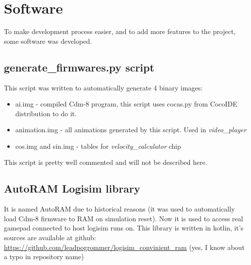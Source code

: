 \documentclass[12pt,a4paper]{article}
\let\oldsection\section
\renewcommand\section{\clearpage\oldsection}
\newcommand{\chip}[1]{{\itshape#1}}
\begin{document}
    \section{Software}
    To make development process easier, and to add more features to the project, some software was developed.
    \subsection{generate\_firmwares.py script}
    This script was written to automatically generate 4 binary images:\begin{itemize}
        \item ai.img - compiled Cdm-8 program, this script uses cocas.py from CocoIDE distribution to do it.
        \item animation.img - all animations generated by this script. Used in \chip{video\_player}
        \item cos.img and sin.img - tables for \chip{velocity\_calculator} chip
    \end{itemize}
    This script is pretty well commented and will not be described here.
    \subsection{AutoRAM Logisim library}
    It is named AutoRAM due to historical reasons (it was used to automatically load Cdm-8 firmware to RAM on simulation reset).
    Now it is used to access real gamepad connected to host logisim runs on.
    This library is written in kotlin, it's sources are available at github: {\color{blue}\url{https://github.com/leadpogrommer/logisim_convinient_ram}} (yes, I know about a typo in repository name)
\end{document}

